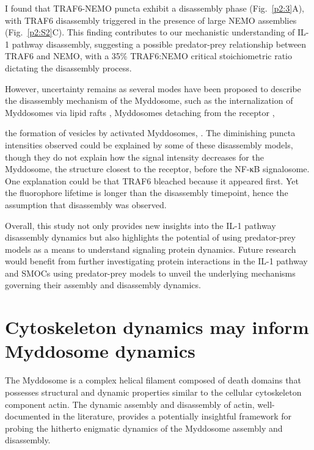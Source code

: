 I found that TRAF6-NEMO puncta exhibit a disassembly phase (Fig.~\ref{p2:3}A), with TRAF6 disassembly triggered in the presence of large NEMO assemblies (Fig.~\ref{p2:S2}C). This finding contributes to our mechanistic understanding of IL-1 pathway disassembly, suggesting a possible predator-prey relationship between TRAF6 and NEMO, with a 35\% TRAF6:NEMO critical stoichiometric ratio dictating the disassembly process.

However, uncertainty remains as several modes have been proposed to describe the disassembly mechanism of the Myddosome, such as the internalization of Myddosomes via lipid rafts \autocite{Triantafilou_2004}\autocite{Triantafilou_2006}\autocite{Barbalat_2009}\autocite{Ruysschaert_2015}, Myddosomes detaching from the receptor \autocite{Latty_2018}, 

the formation of vesicles by activated Myddosomes,
\autocite{Balka_2019}\autocite{Thieblemont_1999}\autocite{Kagan_2008}\autocite{Manček-Keber_2018}\autocite{Nguyen_2017}. The diminishing puncta intensities observed could be explained by some of these disassembly models, though they do not explain how the signal intensity decreases for the Myddosome, the structure closest to the receptor, before the NF-κB signalosome. One explanation could be that TRAF6 bleached because it appeared first. Yet the fluorophore lifetime is longer than the disassembly timepoint, hence the assumption that disassembly was observed.

Overall, this study not only provides new insights into the IL-1 pathway disassembly dynamics but also highlights the potential of using predator-prey models as a means to understand signaling protein dynamics. Future research would benefit from further investigating protein interactions in the IL-1 pathway and SMOCs using predator-prey models to unveil the underlying mechanisms governing their assembly and disassembly dynamics.

\section{Cytoskeleton dynamics may inform Myddosome dynamics}
\label{section:cytoskeleton}
The Myddosome is a complex helical filament composed of death domains \autocite{Moncrieffe_2020} that possesses structural and dynamic properties similar to the cellular cytoskeleton component actin. The dynamic assembly and disassembly of actin, well-documented in the literature, provides a potentially insightful framework for probing the hitherto enigmatic dynamics of the Myddosome assembly and disassembly.
 
